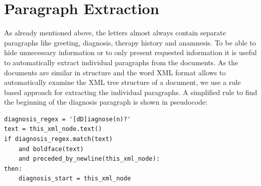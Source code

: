 
\section{Paragraph Extraction}

As already mentioned above, the letters almost always contain separate
paragraphs like greeting, diagnosis, therapy history and anamnesis.
To be able to hide unnecessary information or to only present requested
information it is useful to automatically extract individual
paragraphs from the documents. As the documents are similar in structure
and the word XML format allows to automatically examine the XML tree
structure of a document, we use a rule based approach for extracting
the individual paragraphs. A simplified rule to find the beginning of the diagnosis paragraph is shown in pseudocode:
%
%		
%		
\bigskip

\begin{lstlisting}
diagnosis_regex = '[dD]iagnose(n)?'
text = this_xml_node.text()
if diagnosis_regex.match(text)
	and boldface(text)
	and preceded_by_newline(this_xml_node):
then:
	diagnosis_start = this_xml_node
\end{lstlisting}

